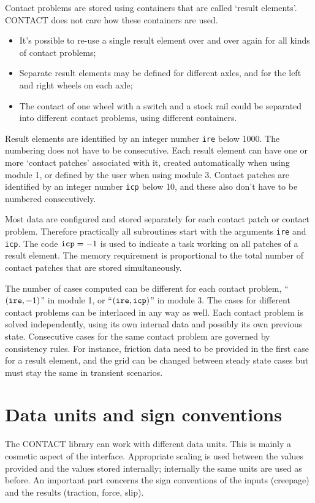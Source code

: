 \documentclass[12pt]{report}
\begin{document}
Contact problems are stored using containers that are called `result
elements'. CONTACT does not care how these containers are used. 
\begin{itemize}
\item It's possible to re-use a single result element over and over again
        for all kinds of contact problems;
\item Separate result elements may be defined for different axles, and for
        the left and right wheels on each axle;
\item The contact of one wheel with a switch and a stock rail could be
        separated into different contact problems, using different
        containers.
\end{itemize}
Result elements are identified by an integer number {\tt ire} below 1000.
The numbering does not have to be consecutive. Each result element can have
one or more `contact patches' associated with it, created automatically
when using module 1, or defined by the user when using module 3. Contact
patches are identified by an integer number {\tt icp} below 10, and these
also don't have to be numbered consecutively.

Most data are configured and stored separately for each contact patch or
contact problem. Therefore practically all subroutines start with the
arguments {\tt ire} and {\tt icp}. The code ${\tt icp}=-1$ is used to
indicate a task working on all patches of a result element. The memory
requirement is proportional to the total number of contact patches that are
stored simultaneously.

The number of cases computed can be different for each contact problem,
``$({\tt ire},-1)$'' in module 1, or ``$({\tt ire},{\tt icp})$'' in module 3.
The cases for different contact problems can be interlaced in any way as
well. Each contact problem is solved independently, using its own internal
data and possibly its own previous state. Consecutive cases for the
same contact problem are governed by consistency rules. For instance,
friction data need to be provided in the first case for a result element,
and the grid can be changed between steady state cases but must stay the
same in transient scenarios.

\section{Data units and sign conventions}
\label{sec:units}

The CONTACT library can work with different data units. This is mainly a
cosmetic aspect of the interface. Appropriate scaling is used between the
values provided and the values stored internally; internally the same
units are used as before. An important part concerns the sign conventions
of the inputs (creepage) and the results (traction, force, slip).
\end{document}
